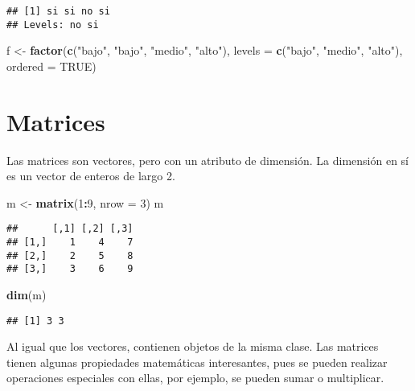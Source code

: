 \documentclass[spanish,]{book}
\newenvironment{Shaded}{\begin{snugshade}}{\end{snugshade}}
\newcommand{\KeywordTok}[1]{\textcolor[rgb]{0.13,0.29,0.53}{\textbf{#1}}}
\newcommand{\DataTypeTok}[1]{\textcolor[rgb]{0.13,0.29,0.53}{#1}}
\newcommand{\DecValTok}[1]{\textcolor[rgb]{0.00,0.00,0.81}{#1}}
\newcommand{\StringTok}[1]{\textcolor[rgb]{0.31,0.60,0.02}{#1}}
\newcommand{\OtherTok}[1]{\textcolor[rgb]{0.56,0.35,0.01}{#1}}
\newcommand{\OperatorTok}[1]{\textcolor[rgb]{0.81,0.36,0.00}{\textbf{#1}}}
\newcommand{\NormalTok}[1]{#1}
\begin{document}
\begin{verbatim}
## [1] si si no si
## Levels: no si
\end{verbatim}

\begin{Shaded}
\begin{Highlighting}[]
\NormalTok{f <-}\StringTok{ }\KeywordTok{factor}\NormalTok{(}\KeywordTok{c}\NormalTok{(}\StringTok{"bajo"}\NormalTok{, }\StringTok{"bajo"}\NormalTok{, }\StringTok{"medio"}\NormalTok{, }\StringTok{"alto"}\NormalTok{),}
            \DataTypeTok{levels =} \KeywordTok{c}\NormalTok{(}\StringTok{"bajo"}\NormalTok{, }\StringTok{"medio"}\NormalTok{, }\StringTok{"alto"}\NormalTok{),}
            \DataTypeTok{ordered =} \OtherTok{TRUE}\NormalTok{)}
\end{Highlighting}
\end{Shaded}

\section{Matrices}\label{matrices}

Las matrices son vectores, pero con un atributo de dimensión. La
dimensión en sí es un vector de enteros de largo 2.

\begin{Shaded}
\begin{Highlighting}[]
\NormalTok{m <-}\StringTok{ }\KeywordTok{matrix}\NormalTok{(}\DecValTok{1}\OperatorTok{:}\DecValTok{9}\NormalTok{, }\DataTypeTok{nrow =} \DecValTok{3}\NormalTok{)}
\NormalTok{m}
\end{Highlighting}
\end{Shaded}

\begin{verbatim}
##      [,1] [,2] [,3]
## [1,]    1    4    7
## [2,]    2    5    8
## [3,]    3    6    9
\end{verbatim}

\begin{Shaded}
\begin{Highlighting}[]
\KeywordTok{dim}\NormalTok{(m)}
\end{Highlighting}
\end{Shaded}

\begin{verbatim}
## [1] 3 3
\end{verbatim}

Al igual que los vectores, contienen objetos de la misma clase. Las
matrices tienen algunas propiedades matemáticas interesantes, pues se
pueden realizar operaciones especiales con ellas, por ejemplo, se pueden
sumar o multiplicar.
\end{document}
